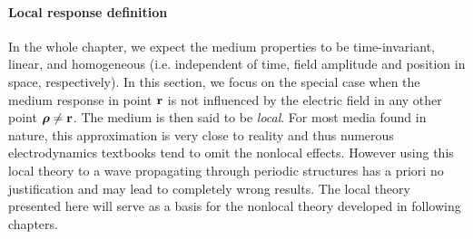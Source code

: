 \paragraph{Local response definition} \label{subsection_local_resp} %
In the whole chapter, we expect the medium properties to be time-invariant, linear, and homogeneous (i.e. independent of time, field amplitude and position in space, respectively). 
In this section, we focus on the special case when the medium response in point ${\mathbf{r}}$ is not influenced by the electric field in any other point $\boldsymbol{\rho} \neq {\mathbf{r}}$. The medium is then said to be \textit{local}. 
For most media found in nature, this approximation is very close to reality and thus numerous electrodynamics textbooks tend to omit the nonlocal effects. 
However using this local theory to a wave propagating through periodic structures has a priori no justification and may lead to completely wrong results. The local theory presented here will serve as a basis for the nonlocal theory developed in following chapters.

